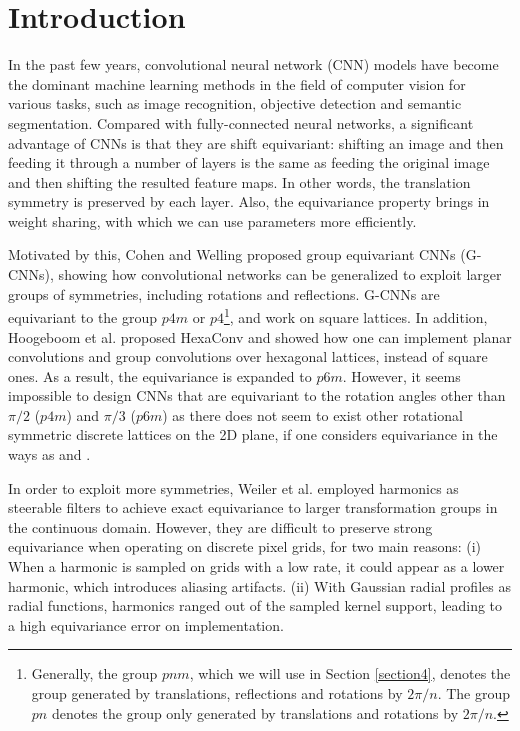 \documentclass{article}
\begin{document}
\section{Introduction \label{intro}}
In the past few years, convolutional neural network (CNN) models have become the dominant machine learning methods in the field of computer vision for various tasks, such as image recognition, objective detection and semantic segmentation. Compared with fully-connected neural networks, a significant advantage of CNNs is that they are shift equivariant: shifting an image and then feeding it through a number of layers is the same as feeding the original image and then shifting the resulted feature maps. In other words, the translation symmetry is preserved by each layer. Also, the equivariance property brings in weight sharing, with which we can use parameters more efficiently.

Motivated by this, Cohen and Welling  proposed group equivariant CNNs (G-CNNs), showing how convolutional networks can be generalized to exploit larger groups of symmetries, including rotations and reflections. G-CNNs are equivariant to the group $p4m$ or $p4$\footnote{Generally, the group $pnm$, which we will use in Section \ref{section4}, denotes the group generated by translations, reflections and rotations by $2\pi/n$. The group $pn$ denotes the group only generated by translations and rotations by $2\pi/n$.}, and work on square lattices. In addition, Hoogeboom et al.  proposed HexaConv and showed how one can implement planar convolutions and group convolutions over hexagonal lattices, instead of square ones. As a result, the equivariance is expanded to $p6m$. However, it seems impossible to design CNNs that are equivariant to the rotation angles other than $\pi/2$ ($p4m$) and $\pi/3$ ($p6m$) as there does not seem to exist other rotational symmetric discrete lattices on the 2D plane, if one considers equivariance in the ways as \cite{cohen2016group} and \cite{hoogeboom2018hexaconv}.

In order to exploit more symmetries, Weiler et al.  employed harmonics as steerable filters to achieve exact equivariance to larger transformation groups in the continuous domain. However, they are difficult to preserve strong equivariance when operating on discrete pixel grids, for two main reasons: (i) When a harmonic is sampled on grids with a low rate, it could appear as a lower harmonic, which introduces aliasing artifacts. (ii) With Gaussian radial profiles as radial functions, harmonics ranged out of the sampled kernel support, leading to a high equivariance error on implementation.
\end{document}
